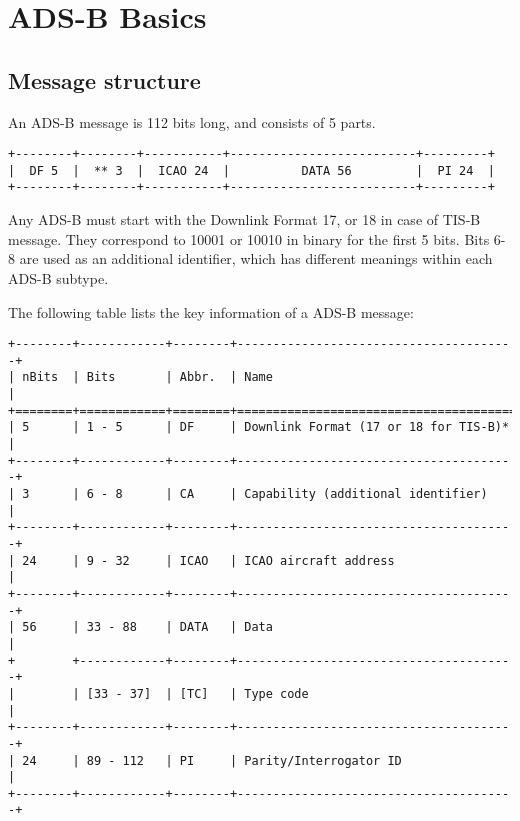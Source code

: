 \section{ADS-B Basics}\label{introduction}

\subsection{Message structure}\label{message-structure}

An ADS-B message is 112 bits long, and consists of 5 parts.

\begin{verbatim}
+--------+--------+-----------+--------------------------+---------+
|  DF 5  |  ** 3  |  ICAO 24  |          DATA 56         |  PI 24  |
+--------+--------+-----------+--------------------------+---------+
\end{verbatim}

Any ADS-B must start with the Downlink Format 17, or 18 in case of TIS-B
message. They correspond to 10001 or 10010 in binary for the first 5
bits. Bits 6-8 are used as an additional identifier, which has different
meanings within each ADS-B subtype.

The following table lists the key information of a ADS-B message:

\begin{verbatim}
+--------+------------+--------+---------------------------------------+
| nBits  | Bits       | Abbr.  | Name                                  |
+========+============+========+=======================================+
| 5      | 1 - 5      | DF     | Downlink Format (17 or 18 for TIS-B)* |
+--------+------------+--------+---------------------------------------+
| 3      | 6 - 8      | CA     | Capability (additional identifier)    |
+--------+------------+--------+---------------------------------------+
| 24     | 9 - 32     | ICAO   | ICAO aircraft address                 |
+--------+------------+--------+---------------------------------------+
| 56     | 33 - 88    | DATA   | Data                                  |
+        +------------+--------+---------------------------------------+
|        | [33 - 37]  | [TC]   | Type code                             |
+--------+------------+--------+---------------------------------------+
| 24     | 89 - 112   | PI     | Parity/Interrogator ID                |
+--------+------------+--------+---------------------------------------+
\end{verbatim}

